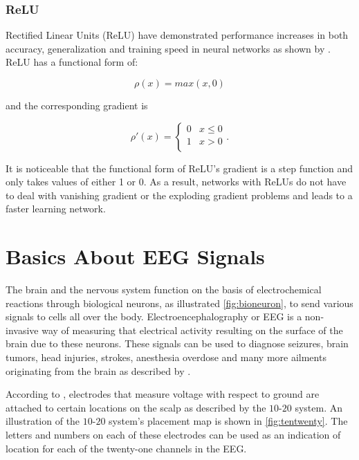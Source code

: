 \subsubsection*{ReLU}

Rectified Linear Units (ReLU) have demonstrated performance increases in both accuracy, generalization and training speed in neural networks as shown by \citet{dahl2013improving}. ReLU has a functional form of:

\begin{equation}
	\rho(x) = max(x, 0)
\end{equation}

\noindent
and the corresponding gradient is 

\begin{equation}
	\rho'(x) =  \begin{cases} 
		
	0 & x \leq 0 \\
	1 & x > 0 \\
	\end{cases}.
\end{equation}

\noindent It is noticeable that the functional form of ReLU's gradient is a step function and only takes values of either 1 or 0. As a result, networks with ReLUs do not have to deal with vanishing gradient or the exploding gradient problems and leads to a faster learning network.



\section{Basics About EEG Signals}

The brain and the nervous system function on the basis of electrochemical reactions through biological neurons, as illustrated \cref{fig:bioneuron}, to send various signals to cells all over the body. Electroencephalography or EEG is a non-invasive way of measuring that electrical activity resulting on the surface of the brain due to these neurons. These signals can be used to diagnose seizures, brain tumors, head injuries, strokes, anesthesia overdose and many more ailments originating from the brain as described by \citet{mayo_eegs}.

According to \citet{eegs_info}, electrodes that measure voltage with respect to ground are attached to certain locations on the scalp as described by the $10$-$20$ system. An illustration of the $10$-$20$ system's placement map is shown in \cref{fig:tentwenty}. The letters and numbers on each of these electrodes can be used as an indication of location for each of the twenty-one channels in the EEG. 


